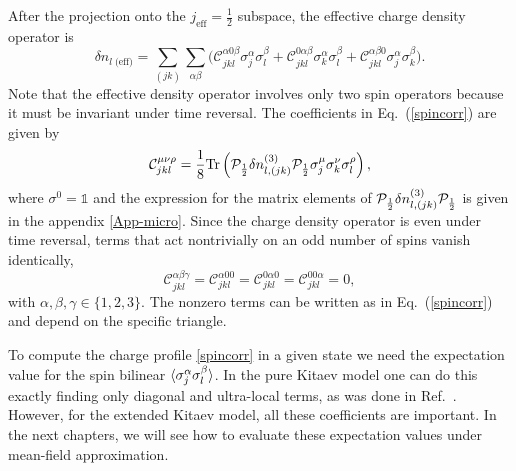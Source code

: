 After the projection  onto the $j_{\text{eff}}=\frac{1}{2}$ subspace, the effective charge density operator is
\begin{equation}
\delta n_{l \; \text{(eff)} }  =
\sum_{(jk)}\sum_{\alpha\beta} \Big(  \mathcal{C}_{jkl}^{\alpha 0 \beta } \sigma_j^\alpha \sigma_l^\beta \!+\mathcal{C}_{jkl}^{ 0 \alpha\beta } \sigma_k^\alpha \sigma_l^\beta\! +
\mathcal{C}_{jkl}^{   \alpha\beta 0 } \sigma_j^\alpha \sigma_k^\beta  \Big).\label{spincorr}
\end{equation}
Note that the effective density operator involves only two spin operators because it must be invariant under time reversal.
The coefficients in  Eq.~(\ref{spincorr}) are given by
\begin{equation}
    \mathcal{C}_{jkl}^{\mu\nu\rho} = \frac{1}{8} \text{Tr} \left( \mathcal{P}_{\frac12}  \delta n_{l,(jk)}^{(3)} \mathcal{P}_{\frac12} \sigma^\mu_j \sigma^\nu_k \sigma^\rho_l  \right)
, \label{eq:II-5-C}
\end{equation}
where $\sigma^{0}=\mathbb{1}$ and the expression for the matrix elements of $\mathcal{P}_{\frac12}  \delta n_{l,(jk)}^{(3)} \mathcal{P}_{\frac12}$ is given in the appendix \ref{App-micro}.
Since the charge density operator is even under time reversal, terms that act nontrivially on an odd number of spins vanish identically,
\begin{equation}
     \mathcal{C}_{jkl}^{\alpha\beta\gamma} =     \mathcal{C}_{jkl}^{\alpha00} =     \mathcal{C}_{jkl}^{0\alpha0}= \mathcal{C}_{jkl}^{00\alpha} = 0,
\end{equation}
with $\alpha, \beta, \gamma \in \{1,2,3\}$.
The nonzero terms can be written as in Eq.~(\ref{spincorr}) and depend on the specific triangle.



\vspace{3mm}

To compute the charge profile \eqref{spincorr} in a given state we need the expectation value for the spin bilinear  $\braket{\sigma_j^\alpha \sigma_l^\beta}$. In the pure Kitaev model one can do this exactly finding only diagonal and ultra-local terms, as was done in Ref.~\cite{Pereira2020}.
However, for the extended Kitaev model, all these coefficients are important.
In the next chapters, we will see how to evaluate these expectation values under mean-field approximation.

